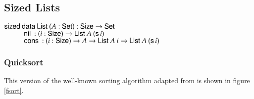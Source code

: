 \clearpage

\subsection{Sized Lists}
\begin{bsp}
$\mathsf{sized}\: \mathsf{data}\: \mathsf{List}\: ( A : \mathsf{Set} ) : \mathsf{Size} \rightarrow \mathsf{Set} $ \\
$\spcx \nil : \EPi{i}{\Size}{ \SList A \: (\s i)} $\\
$\spcx \cons : \EPi{i}{\Size}{ A \ra \SList A \: i \ra \SList A \: (\s i)} $
\end{bsp}

\subsubsection{Quicksort}
This version of the well-known sorting algorithm adapted from \cite{abel:rairo04} is shown in figure \ref{fsort}.

